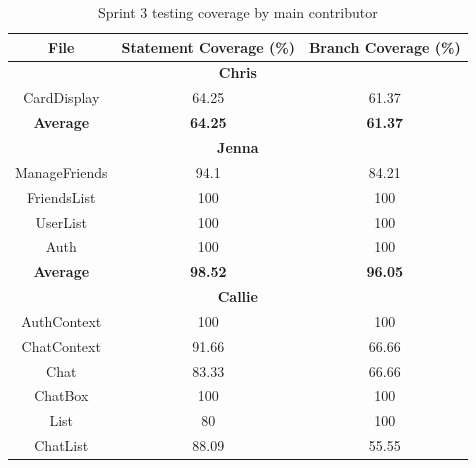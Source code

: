 \begin{table}[!hbt]
\centering
\caption{Sprint 3 testing coverage by main contributor}
\label{tab: sprint 3 testing}
\begin{tabular}{|ccc|}
\hline
\multicolumn{1}{|c|}{\textbf{File}} & \multicolumn{1}{c|}{\textbf{Statement Coverage (\%)}} & \textbf{Branch Coverage (\%)} \\ \hline
\multicolumn{3}{|c|}{\textbf{Chris}}                                                          \\ \hline
\multicolumn{1}{|c|}{CardDisplay}      & \multicolumn{1}{c|}{64.25}          & 61.37          \\ \hline
\multicolumn{1}{|c|}{\textbf{Average}} & \multicolumn{1}{c|}{\textbf{64.25}} & \textbf{61.37} \\ \hline
\multicolumn{3}{|c|}{\textbf{Jenna}}                                                          \\ \hline
\multicolumn{1}{|c|}{ManageFriends}    & \multicolumn{1}{c|}{94.1}           & 84.21          \\ \hline
\multicolumn{1}{|c|}{FriendsList}      & \multicolumn{1}{c|}{100}            & 100            \\ \hline
\multicolumn{1}{|c|}{UserList}         & \multicolumn{1}{c|}{100}            & 100            \\ \hline
\multicolumn{1}{|c|}{Auth}             & \multicolumn{1}{c|}{100}            & 100            \\ \hline
\multicolumn{1}{|c|}{\textbf{Average}} & \multicolumn{1}{c|}{\textbf{98.52}} & \textbf{96.05} \\ \hline
\multicolumn{3}{|c|}{\textbf{Callie}}                                                         \\ \hline
\multicolumn{1}{|c|}{AuthContext}      & \multicolumn{1}{c|}{100}            & 100            \\ \hline
\multicolumn{1}{|c|}{ChatContext}      & \multicolumn{1}{c|}{91.66}          & 66.66          \\ \hline
\multicolumn{1}{|c|}{Chat}             & \multicolumn{1}{c|}{83.33}          & 66.66          \\ \hline
\multicolumn{1}{|c|}{ChatBox}          & \multicolumn{1}{c|}{100}            & 100            \\ \hline
\multicolumn{1}{|c|}{List}             & \multicolumn{1}{c|}{80}             & 100            \\ \hline
\multicolumn{1}{|c|}{ChatList}         & \multicolumn{1}{c|}{88.09}          & 55.55          \\ \hline

\end{tabular}
\end{table}
